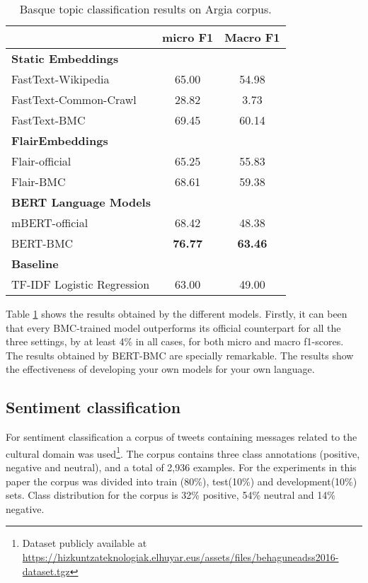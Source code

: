 \documentclass[10pt, a4paper]{article}
\begin{document}
\begin{table}[!ht]\small
\centering
\begin{tabular}{@{\hspace{0.3cm}}lcc} \hline
 {\textbf{}} & {\textbf{micro F1}} &  {\textbf{Macro F1}} \\ \hline
\textbf{Static Embeddings} & & \\
FastText-Wikipedia & 65.00 & 54.98 \\
FastText-Common-Crawl & 28.82 & 3.73  \\
FastText-BMC  & 69.45 & 60.14 \\
\hline%
\textbf{FlairEmbeddings}\\
Flair-official & 65.25 & 55.83 \\
Flair-BMC  & 68.61 & 59.38  \\ \hline
\textbf{BERT Language Models}\\
mBERT-official  & 68.42 & 48.38  \\
BERT-BMC  & \textbf{76.77}	& \textbf{63.46}  \\
\hline
\textbf{Baseline} \\
TF-IDF Logistic Regression & 63.00 & 49.00 \\
\hline
\end{tabular}
\caption{Basque topic classification results on Argia corpus.}\label{tab:topic}
\end{table}

Table \ref{tab:topic} shows the results obtained by the different models. Firstly, it can been that every BMC-trained model outperforms its official counterpart for all the three settings, by at least 4\% in all cases, for both micro and macro f1-scores. The results obtained by BERT-BMC are specially remarkable. The results show the effectiveness of developing your own models for your own language.

\subsection{Sentiment classification}\label{sec:polarity}

For sentiment classification a corpus of tweets containing messages related to the cultural domain was used\footnote{Dataset publicly available at \scriptsize{\url{https://hizkuntzateknologiak.elhuyar.eus/assets/files/behaguneadss2016-dataset.tgz}}}. The corpus contains three class annotations (positive, negative and neutral), and a total of 2,936 examples. For the experiments in this paper the corpus was divided into train (80\%), test(10\%) and development(10\%) sets. Class distribution for the corpus is 32\% positive, 54\% neutral and 14\% negative.
\end{document}
